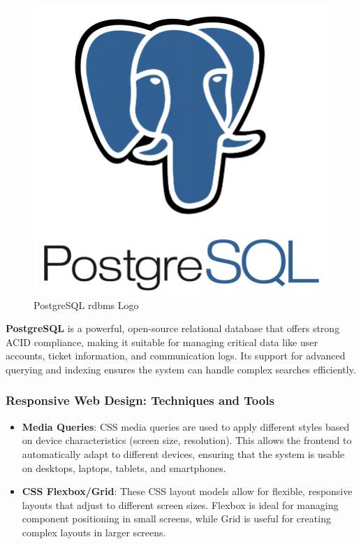 	\begin{figure}[H]
		\centering
		\includegraphics[scale=0.1]{graphics/postgresql.png}
		\caption{PostgreSQL \acs{rdbms} Logo}
		\label{fig:postgresql}
	\end{figure}
	
	\textbf{PostgreSQL} is a powerful, open-source relational database that offers strong ACID compliance, making it suitable for managing critical data like user accounts, ticket information, and communication logs. Its support for advanced querying and indexing ensures the system can handle complex searches efficiently.
	
	
	\subsubsection{Responsive Web Design: Techniques and Tools}
	
	\begin{itemize}
		\item \textbf{Media Queries}: CSS media queries are used to apply different styles based on device characteristics (screen size, resolution). This allows the frontend to automatically adapt to different devices, ensuring that the system is usable on desktops, laptops, tablets, and smartphones.
		
		\item \textbf{CSS Flexbox/Grid}: These CSS layout models allow for flexible, responsive layouts that adjust to different screen sizes. Flexbox is ideal for managing component positioning in small screens, while Grid is useful for creating complex layouts in larger screens.
	\end{itemize}


